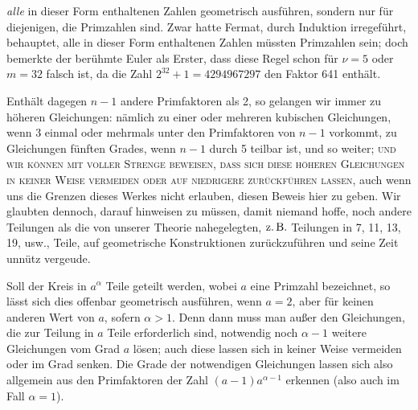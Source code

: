 \textit{alle} in dieser Form enthaltenen Zahlen geometrisch ausführen, sondern nur für diejenigen, die Primzahlen sind. Zwar hatte Fermat, durch Induktion irregeführt, behauptet, alle in dieser Form enthaltenen Zahlen müssten Primzahlen sein; doch bemerkte der berühmte Euler als Erster, dass diese Regel schon für \(\nu=5\) oder \(m=32\) falsch ist, da die Zahl \(2^{32}+1=4294967297\) den Faktor 641 enthält.

Enthält dagegen \(n-1\) andere Primfaktoren als 2, so gelangen wir immer zu höheren Gleichungen: nämlich zu einer oder mehreren kubischen Gleichungen, wenn 3 einmal oder mehrmals unter den Primfaktoren von \(n-1\) vorkommt, zu Gleichungen fünften Grades, wenn \(n-1\) durch 5 teilbar ist, und so weiter; \textsc{und wir können mit voller Strenge beweisen, dass sich diese höheren Gleichungen in keiner Weise vermeiden oder auf niedrigere zurückführen lassen,} auch wenn uns die Grenzen dieses Werkes nicht erlauben, diesen Beweis hier zu geben. Wir glaubten dennoch, darauf hinweisen zu müssen, damit niemand hoffe, noch andere Teilungen als die von unserer Theorie nahegelegten, \(\text{z.\,B.}\) Teilungen in 7, 11, 13, 19, usw., Teile, auf geometrische Konstruktionen zurückzuführen und seine Zeit unnütz vergeude.


Soll der Kreis in \(a^\alpha\) Teile geteilt werden, wobei \(a\) eine Primzahl bezeichnet, so lässt sich dies offenbar geometrisch ausführen, wenn \(a=2\), aber für keinen anderen Wert von \(a\), sofern \(\alpha>1\). Denn dann muss man außer den Gleichungen, die zur Teilung in \(a\) Teile erforderlich sind, notwendig noch \(\alpha-1\) weitere Gleichungen vom Grad \(a\) lösen; auch diese lassen sich in keiner Weise vermeiden oder im Grad senken. Die Grade der notwendigen Gleichungen lassen sich also allgemein aus den Primfaktoren der Zahl \((a-1)a^{\alpha-1}\) erkennen (also auch im Fall \(\alpha=1\)).

